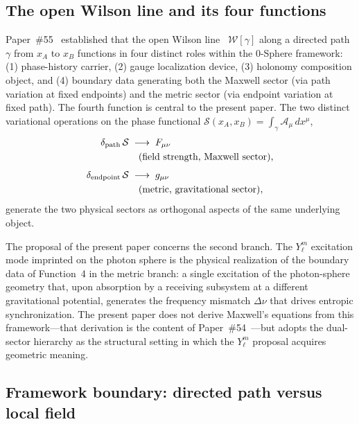 \documentclass[%
 reprint, amsmath,amssymb, aps, prb, ]{revtex4-2}
\numberwithin{equation}{section}
\newcommand{\WL}{\mathcal{W}}
\begin{document}
\subsection{The open Wilson line and its four functions}

Paper~\#55~\cite{hanamura55} established that the open Wilson line~\cite{wilson1974} $\WL[\gamma]$ along a directed path $\gamma$ from $x_A$ to $x_B$ functions in four distinct roles within the 0-Sphere framework: (1) phase-history carrier, (2) gauge localization device, (3) holonomy composition object, and (4) boundary data generating both the Maxwell sector (via path variation at fixed endpoints) and the metric sector (via endpoint variation at fixed path). The fourth function is central to the present paper. The two distinct variational operations on the phase functional $\mathcal{S}(x_A, x_B) = \int_\gamma \mathcal{A}_\mu\, dx^\mu$,
\begin{align}
\delta_{\rm path}\,\mathcal{S}
&\;\longrightarrow\; F_{\mu\nu}
\notag\\
&\quad\text{(field strength, Maxwell sector)},
\label{eq:path_var}\\[4pt]
\delta_{\rm endpoint}\,\mathcal{S}
&\;\longrightarrow\; g_{\mu\nu}
\notag\\
&\quad\text{(metric, gravitational sector)},
\label{eq:endpoint_var}
\end{align}
generate the two physical sectors as orthogonal aspects of the same underlying object.

The proposal of the present paper concerns the second branch. The $Y_\ell^m$ excitation mode imprinted on the photon sphere is the physical realization of the boundary data of Function~4 in the metric branch: a single excitation of the photon-sphere geometry that, upon absorption by a receiving subsystem at a different gravitational potential, generates the frequency mismatch $\Delta\nu$ that drives entropic synchronization. The present paper does not derive Maxwell's equations from this framework---that derivation is the content of Paper~\#54~\cite{hanamura54}---but adopts the dual-sector hierarchy as the structural setting in which the $Y_\ell^m$ proposal acquires geometric meaning.

\subsection{Framework boundary: directed path versus local field}
\end{document}
